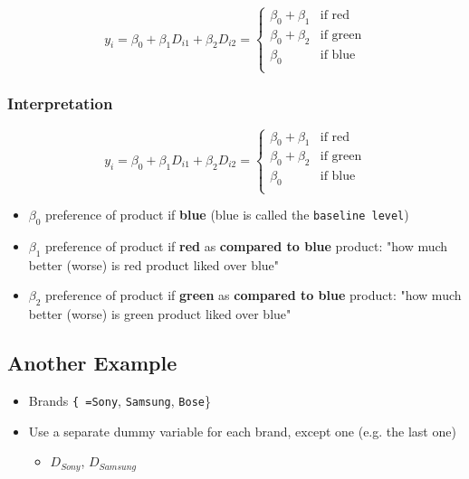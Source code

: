 \documentclass[10pt,article]{article}
\begin{document}
\[ y_i = \beta_0 + \beta_1 D_{i1} + \beta_2 D_{i2} = 
   \begin{cases} 
   \beta_0 + \beta_1 & \text{if red} \\
   \beta_0 + \beta_2 & \text{if green} \\
   \beta_0  & \text{if blue} \\
  \end{cases} \]

\subsubsection{Interpretation}
\label{sec:org38c719c}

\[ y_i = \beta_0 + \beta_1 D_{i1} + \beta_2 D_{i2} = 
   \begin{cases} 
   \beta_0 + \beta_1 & \text{if red} \\
   \beta_0 + \beta_2 & \text{if green} \\
   \beta_0  & \text{if blue} \\
  \end{cases} \]
\begin{itemize}
\item \(\beta_0\) preference of product if  {\bf blue} (blue is called the \texttt{baseline level})
\item \(\beta_1\) preference of product if  {\bf red} as  {\bf compared to blue} product:
"how much better (worse) is red product liked over blue"
\item \(\beta_2\) preference of product if  {\bf green} as  {\bf compared to blue} product:
"how much better (worse) is green product liked over blue"
\end{itemize}

\subsection{Another Example}
\label{sec:orgfcdc2a0}
\begin{itemize}
\item Brands \texttt{\{ =Sony}, \texttt{Samsung}, \texttt{Bose}\}

\item Use a separate dummy variable for each brand, except one (e.g. the last one)
\begin{itemize}
\item \(D_{Sony}\), \(D_{Samsung}\)
\end{itemize}
\end{itemize}
\end{document}
